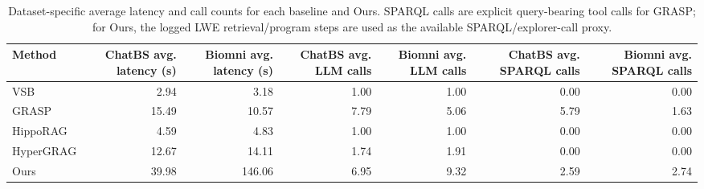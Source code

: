 \begin{table}[t]
\centering
\caption{Dataset-specific average latency and call counts for each baseline and Ours. SPARQL calls are explicit query-bearing tool calls for GRASP; for Ours, the logged LWE retrieval/program steps are used as the available SPARQL/explorer-call proxy.}
\label{tab:latency-call-summary}
\scriptsize
\begin{tabular}{lrrrrrr}
\toprule
Method & ChatBS avg. latency (s) & Biomni avg. latency (s) & ChatBS avg. LLM calls & Biomni avg. LLM calls & ChatBS avg. SPARQL calls & Biomni avg. SPARQL calls \\
\midrule
VSB & 2.94 & 3.18 & 1.00 & 1.00 & 0.00 & 0.00 \\
GRASP & 15.49 & 10.57 & 7.79 & 5.06 & 5.79 & 1.63 \\
HippoRAG & 4.59 & 4.83 & 1.00 & 1.00 & 0.00 & 0.00 \\
HyperGRAG & 12.67 & 14.11 & 1.74 & 1.91 & 0.00 & 0.00 \\
Ours & 39.98 & 146.06 & 6.95 & 9.32 & 2.59 & 2.74 \\
\bottomrule
\end{tabular}
\end{table}
